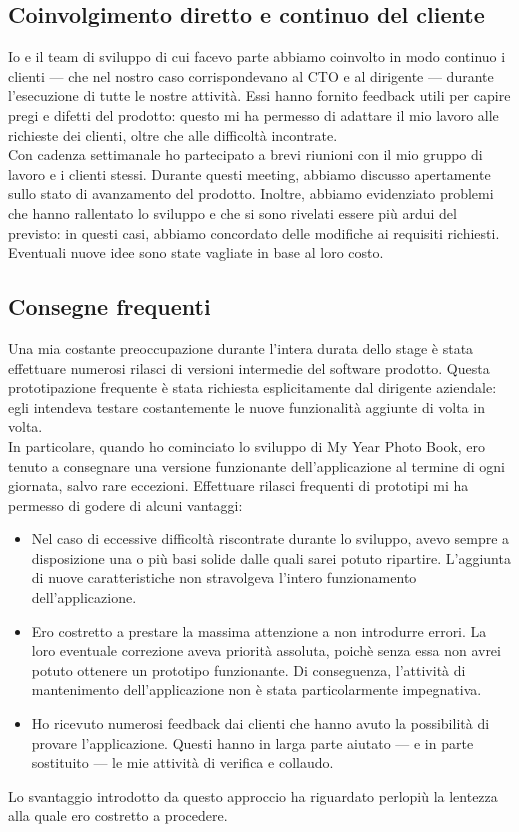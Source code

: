 		\subsection{Coinvolgimento diretto e continuo del cliente}
			Io e il team di sviluppo di cui facevo parte abbiamo coinvolto in modo continuo i clienti — che nel nostro caso
			corrispondevano al CTO e al dirigente — durante l'esecuzione di tutte le nostre attività. Essi hanno fornito feedback utili
			per capire pregi e difetti del prodotto: questo mi ha permesso di adattare il mio lavoro alle richieste dei clienti, oltre che
			alle difficoltà incontrate.\\
			Con cadenza settimanale ho partecipato a brevi riunioni con il mio gruppo di lavoro e i clienti stessi. Durante questi
			meeting, abbiamo discusso apertamente sullo stato di avanzamento del prodotto. Inoltre, abbiamo evidenziato problemi che
			hanno rallentato lo sviluppo e che si sono rivelati essere più ardui del previsto: in questi casi, abbiamo concordato delle
			modifiche ai requisiti richiesti. Eventuali nuove idee sono state vagliate in base al loro costo.
		\subsection{Consegne frequenti}
			Una mia costante preoccupazione durante l'intera durata dello stage è stata effettuare numerosi rilasci di versioni
			intermedie del software prodotto. Questa prototipazione frequente è stata richiesta esplicitamente dal dirigente aziendale:
			egli intendeva testare costantemente le nuove funzionalità aggiunte di volta in volta.\\
			In particolare, quando ho cominciato lo sviluppo di My Year Photo Book, ero tenuto a consegnare una versione funzionante
			dell'applicazione al termine di ogni giornata, salvo rare eccezioni. Effettuare rilasci frequenti di prototipi mi ha permesso
			di godere di alcuni vantaggi:
			\begin{itemize}
				\item Nel caso di eccessive difficoltà riscontrate durante lo sviluppo, avevo sempre a disposizione una o più basi
				solide dalle quali sarei potuto ripartire. L'aggiunta di nuove caratteristiche non stravolgeva l'intero funzionamento
				dell'applicazione.
				\item Ero costretto a prestare la massima attenzione a non introdurre errori. La loro eventuale correzione aveva
				priorità assoluta, poichè senza essa non avrei potuto ottenere un prototipo funzionante. Di conseguenza, l'attività di
				mantenimento dell'applicazione non è stata particolarmente impegnativa.
				\item Ho ricevuto numerosi feedback dai clienti che hanno avuto la possibilità di provare l'applicazione. Questi
				hanno in larga parte aiutato — e in parte sostituito — le mie attività di verifica e collaudo.
			 \end{itemize}
			 Lo svantaggio introdotto da questo approccio ha riguardato perlopiù la lentezza alla quale ero costretto a procedere.
